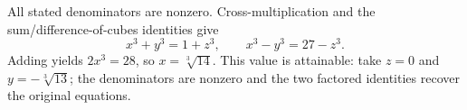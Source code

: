 All stated denominators are nonzero. Cross-multiplication and the sum/difference-of-cubes identities give
\[
x^3+y^3=1+z^3,\qquad x^3-y^3=27-z^3.
\]
Adding yields $2x^3=28$, so $\boxed{x=\sqrt[3]{14}}$. This value is attainable: take $z=0$ and $y=-\sqrt[3]{13}$; the denominators are nonzero and the two factored identities recover the original equations.
